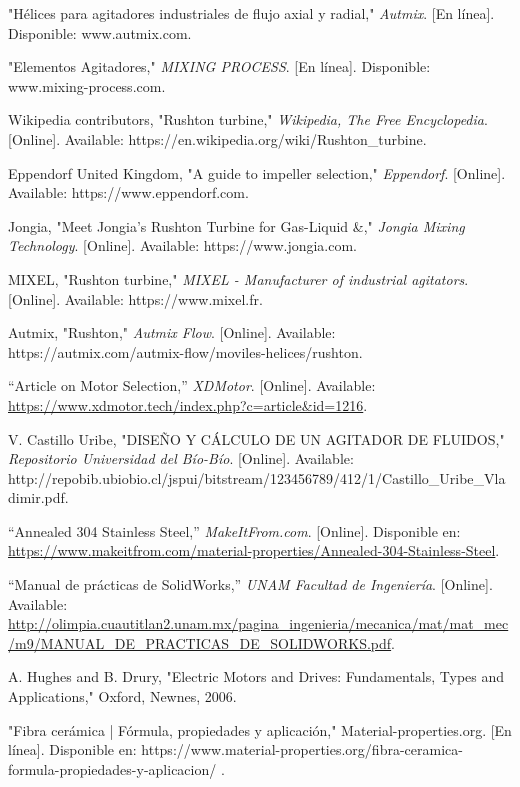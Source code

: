 \documentclass[14pt,oneside]{extarticle} %
\begin{document}
\begin{thebibliography}{5}
    "Hélices para agitadores industriales de flujo axial y radial," \textit{Autmix}. [En línea]. Disponible: www.autmix.com. 

    "Elementos Agitadores," \textit{MIXING PROCESS}. [En línea]. Disponible: www.mixing-process.com. 

    Wikipedia contributors, "Rushton turbine," \textit{Wikipedia, The Free Encyclopedia}. [Online]. Available: https://en.wikipedia.org/wiki/Rushton\_turbine. 

    Eppendorf United Kingdom, "A guide to impeller selection," \textit{Eppendorf}. [Online]. Available: https://www.eppendorf.com. 

    Jongia, "Meet Jongia’s Rushton Turbine for Gas-Liquid \&," \textit{Jongia Mixing Technology}. [Online]. Available: https://www.jongia.com. 

    MIXEL, "Rushton turbine," \textit{MIXEL - Manufacturer of industrial agitators}. [Online]. Available: https://www.mixel.fr. 

    Autmix, "Rushton," \textit{Autmix Flow}. [Online]. Available: https://autmix.com/autmix-flow/moviles-helices/rushton. 

    ``Article on Motor Selection,'' \textit{XDMotor}. [Online]. Available: \url{https://www.xdmotor.tech/index.php?c=article\&id=1216}. 

    V. Castillo Uribe, "DISEÑO Y CÁLCULO DE UN AGITADOR DE FLUIDOS," \textit{Repositorio Universidad del Bío-Bío}. [Online]. Available: http://repobib.ubiobio.cl/jspui/bitstream/123456789/412/1/Castillo\_Uribe\_Vladimir.pdf. 
    
    ``Annealed 304 Stainless Steel,'' \textit{MakeItFrom.com}. [Online]. Disponible en: \url{https://www.makeitfrom.com/material-properties/Annealed-304-Stainless-Steel}. 

    ``Manual de prácticas de SolidWorks,'' \textit{UNAM Facultad de Ingeniería}. [Online]. Available: \url{http://olimpia.cuautitlan2.unam.mx/pagina_ingenieria/mecanica/mat/mat_mec/m9/MANUAL_DE_PRACTICAS_DE_SOLIDWORKS.pdf}.
    
    A. Hughes and B. Drury, "Electric Motors and Drives: Fundamentals, Types and Applications," Oxford, Newnes, 2006.
    
    "Fibra cerámica | Fórmula, propiedades y aplicación," Material-properties.org. [En línea]. Disponible en: https://www.material-properties.org/fibra-ceramica-formula-propiedades-y-aplicacion/ . 
    

\end{thebibliography}
\end{document}
